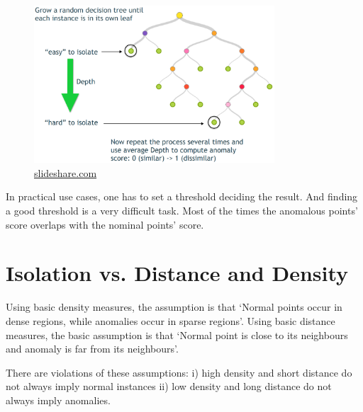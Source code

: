 \vspace{1em}
\begin{figure}[!ht]
    \centering
    \includegraphics[width=0.80\textwidth]{../fig/chapter2/iforest-visualization.png}
    {\href{https://www.slideshare.net/mlvlc/l14-anomaly-detection}{slideshare.com}}
    \label{fig:iforest-visualization}
\end{figure}

In practical use cases, one has to set a threshold deciding the result. And finding a good threshold is a very difficult task. Most of the times the anomalous points' score overlaps with the nominal points' score.

\section{Isolation vs. Distance and Density}
\label{sec:isolation-vs-distance-density}

Using basic density measures, the assumption is that ‘Normal points occur in dense regions, while anomalies occur in sparse regions’.
Using basic distance measures, the basic assumption is that ‘Normal point is close to its neighbours and anomaly is far from its neighbours’.

There are violations of these assumptions: i) high density and short distance do not always imply normal instances ii) low density and long distance do not always imply anomalies.

